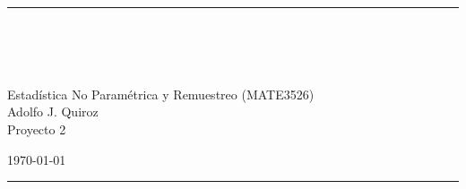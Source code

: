 \fancyhead[C]{}
\hrule \medskip
\begin{minipage}{0.295\textwidth} 
\raggedright
\footnotesize
\firstname \hfill\\ 
\firstid \hfill\\ 
\firstemail \hfill\\
\end{minipage}
\begin{minipage}{0.4\textwidth} 
\centering 
\large 
Estadística No Paramétrica y Remuestreo (MATE3526)\\
\normalsize
Adolfo J. Quiroz\\
Proyecto 2\\
\end{minipage}
\begin{minipage}{0.295\textwidth} 
\raggedleft
\today\hfill\\
\end{minipage}
\medskip\hrule 
\bigskip